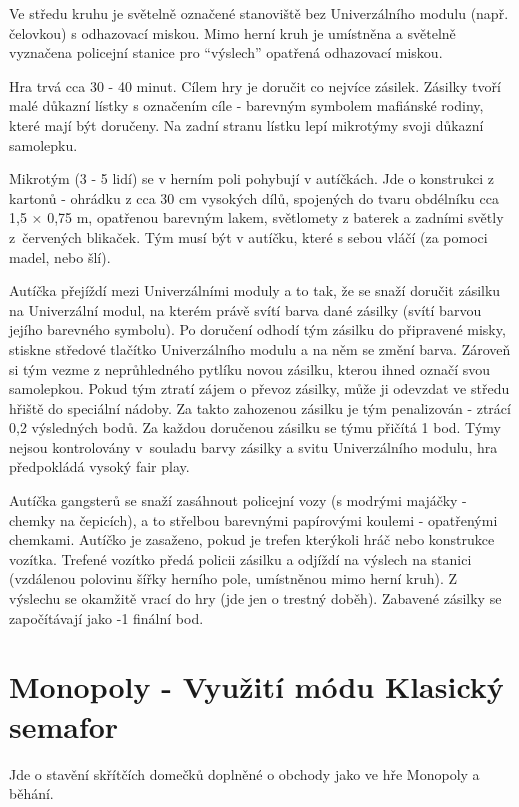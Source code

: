 Ve středu kruhu je světelně označené stanoviště bez Univerzálního modulu (např. čelovkou) s odhazovací miskou. Mimo herní kruh je umístněna a světelně vyznačena policejní stanice pro “výslech” opatřená odhazovací miskou. 

Hra trvá cca 30 - 40 minut. Cílem hry je doručit co nejvíce zásilek. Zásilky tvoří malé důkazní lístky s označením cíle - barevným symbolem mafiánské rodiny, které mají být doručeny. Na zadní stranu lístku lepí mikrotýmy 
svoji důkazní samolepku. 

Mikrotým (3 - 5 lidí) se v herním poli pohybují v autíčkách. Jde o konstrukci z kartonů - ohrádku z cca 30 cm vysokých dílů, spojených do tvaru obdélníku cca 1,5 $\times$ 0,75 m, opatřenou barevným 
lakem, světlomety z baterek a zadními světly z~červených blikaček. Tým musí být v autíčku, které s sebou vláčí (za pomoci madel, nebo šlí). 

Autíčka přejíždí mezi Univerzálními moduly a to tak, že se snaží doručit zásilku na Univerzální modul, na kterém právě svítí barva dané zásilky (svítí barvou jejího barevného symbolu). Po doručení odhodí tým zásilku do 
připravené misky, stiskne středové tlačítko Univerzálního modulu a na něm se změní barva. Zároveň si tým vezme z neprůhledného pytlíku novou zásilku, kterou ihned označí svou samolepkou. Pokud tým ztratí zájem o převoz 
zásilky, může ji odevzdat ve středu hřiště do speciální nádoby. Za takto zahozenou zásilku je tým penalizován - ztrácí 0,2 výsledných bodů. Za každou doručenou zásilku se týmu přičítá 1 bod. Týmy nejsou kontrolovány 
v~souladu barvy zásilky a svitu Univerzálního modulu, hra předpokládá vysoký fair play. 

Autíčka gangsterů se snaží zasáhnout policejní vozy (s modrými majáčky - chemky na čepicích), a to střelbou barevnými papírovými koulemi - opatřenými chemkami. Autíčko je zasaženo, pokud je trefen kterýkoli hráč nebo 
konstrukce vozítka. Trefené vozítko předá policii zásilku a odjíždí na výslech na stanici (vzdálenou polovinu šířky herního pole, umístněnou mimo herní kruh). Z výslechu se okamžitě vrací do hry (jde jen o trestný doběh). 
Zabavené zásilky se započítávají jako -1 finální bod. 

\newpage
\section{Monopoly - Využití módu Klasický semafor}
Jde o stavění skřítčích domečků doplněné o obchody jako ve hře Monopoly a běhání.

